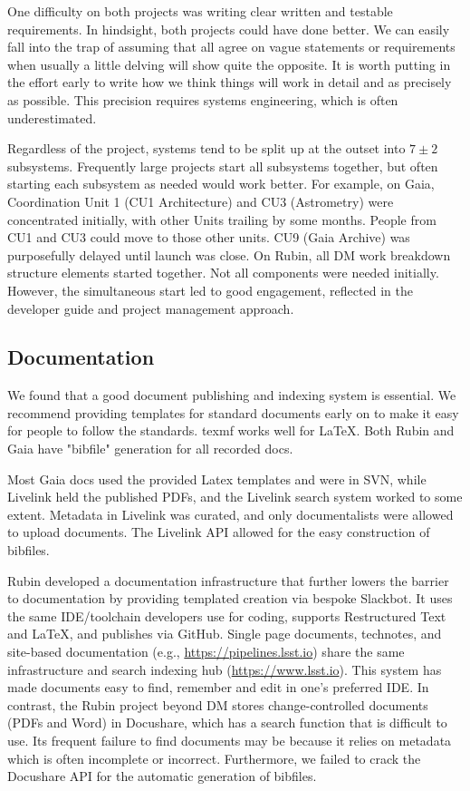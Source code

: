 \documentclass[11pt,twoside]{article}
\begin{document}
One difficulty on both projects was writing clear written and testable requirements. In hindsight, both projects could have done better.
We can easily fall into the trap of assuming that all agree on vague statements or requirements when usually a little delving will show quite the opposite.
It is worth putting in the effort early to write how we think things will work in detail and as precisely as possible.
This precision requires systems engineering, which is often underestimated.


Regardless of the project, systems tend to be split up at the outset into  $7 \pm 2$ subsystems.
Frequently large projects start all subsystems together, but often starting each subsystem as needed would work better.
For example, on Gaia, Coordination Unit 1 (CU1 Architecture) and CU3 (Astrometry) were concentrated initially, with other Units trailing by some months.
People from CU1 and CU3 could move to those other units.
CU9 (Gaia Archive) was purposefully delayed until launch was close.
On Rubin, all DM work breakdown structure elements started together.
Not all components were needed initially.
However, the simultaneous start led to good engagement, reflected in the developer guide and project management approach.


\subsection{Documentation}
We found that a good document publishing and indexing system is essential.
We recommend providing templates for standard documents early on to make it easy for people to follow the standards. texmf works well for \LaTeX. Both Rubin and Gaia have "bibfile" generation for all recorded docs.

Most Gaia docs used the provided Latex templates and were in SVN, while Livelink held the published PDFs, and the Livelink search system worked to some extent.
Metadata in Livelink was curated, and only documentalists were allowed to upload documents.
The Livelink API allowed for the easy construction of bibfiles.

Rubin developed a documentation infrastructure that further lowers the barrier to documentation by providing templated creation via bespoke Slackbot. It uses the same IDE/toolchain developers use for coding, supports Restructured Text and \LaTeX, and publishes via GitHub.
Single page documents, technotes, and site-based documentation (e.g., \url{https://pipelines.lsst.io}) share the same infrastructure \citep{SQR-000} and search indexing hub (\url{https://www.lsst.io}).
This system has made documents easy to find, remember and edit in one's preferred IDE.
In contrast, the Rubin project beyond DM stores change-controlled documents (PDFs and Word) in Docushare, which has a search function that is difficult to use.
Its frequent failure to find documents may be because it relies on metadata which is often incomplete or incorrect.  Furthermore, we failed to crack the Docushare API for the automatic generation of bibfiles.
\end{document}
